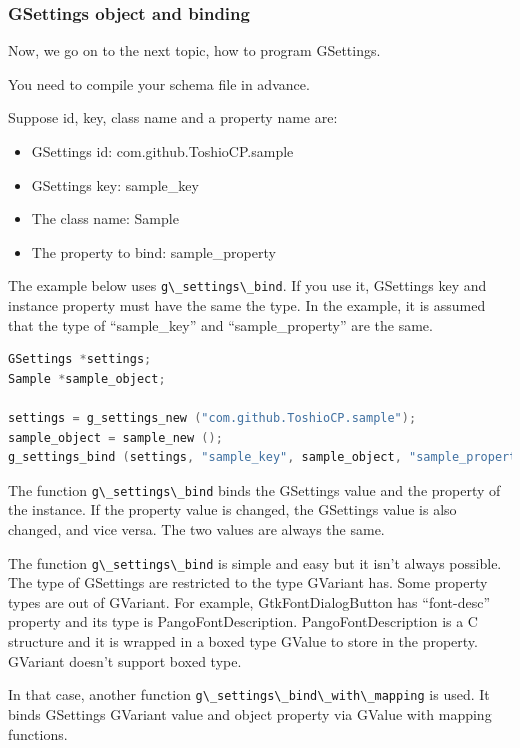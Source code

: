 \subsubsection{GSettings object and
binding}\label{gsettings-object-and-binding}

Now, we go on to the next topic, how to program GSettings.

You need to compile your schema file in advance.

Suppose id, key, class name and a property name are:

\begin{itemize}
\tightlist
\item
  GSettings id: com.github.ToshioCP.sample
\item
  GSettings key: sample\_key
\item
  The class name: Sample
\item
  The property to bind: sample\_property
\end{itemize}

The example below uses \passthrough{\lstinline!g\_settings\_bind!}. If
you use it, GSettings key and instance property must have the same the
type. In the example, it is assumed that the type of ``sample\_key'' and
``sample\_property'' are the same.

\begin{lstlisting}[language=C]
GSettings *settings;
Sample *sample_object;

settings = g_settings_new ("com.github.ToshioCP.sample");
sample_object = sample_new ();
g_settings_bind (settings, "sample_key", sample_object, "sample_property", G_SETTINGS_BIND_DEFAULT);
\end{lstlisting}

The function \passthrough{\lstinline!g\_settings\_bind!} binds the
GSettings value and the property of the instance. If the property value
is changed, the GSettings value is also changed, and vice versa. The two
values are always the same.

The function \passthrough{\lstinline!g\_settings\_bind!} is simple and
easy but it isn't always possible. The type of GSettings are restricted
to the type GVariant has. Some property types are out of GVariant. For
example, GtkFontDialogButton has ``font-desc'' property and its type is
PangoFontDescription. PangoFontDescription is a C structure and it is
wrapped in a boxed type GValue to store in the property. GVariant
doesn't support boxed type.

In that case, another function
\passthrough{\lstinline!g\_settings\_bind\_with\_mapping!} is used. It
binds GSettings GVariant value and object property via GValue with
mapping functions.

